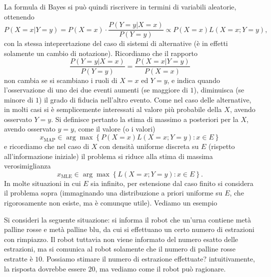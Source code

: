 \documentclass[
  italian,
  letterpaper,
]{book}
\newcommand{\cur}[1]{\left\{ #1 \right\}}
\newcommand{\map}{\operatorname{MAP}}
\newcommand{\mle}{\operatorname{MLE}}
\theoremstyle{definition}
\theoremstyle{remark}
\begin{document}
La formula di Bayes si può quindi riscrivere in termini di variabili
aleatorie, ottenendo
\[ P(X=x | Y =y ) = P(X=x) \cdot  \frac{ P(Y=y | X=x)}{P(Y=y)} \propto P(X=x)L(X=x; Y=y),\]
con la stessa inteprertazione del caso di sistemi di alternative (è in
effetti solamente un cambio di notazione). Ricordiamo che il rapporto
\[ \frac{ P(Y=y | X=x)}{P(Y=y)} = \frac{ P(X=x | Y=y)}{P(X=x)}\] non
cambia se si scambiano i ruoli di \(X=x\) ed \(Y=y\), e indica quando
l'osservazione di uno dei due eventi aumenti (se maggiore di \(1\)),
diminuisca (se minore di \(1\)) il grado di fiducia nell'altro evento.
Come nel caso delle alternative, in molti casi si è semplicemente
interessati al valore più probabile della \(X\), avendo osservato
\(Y=y\). Si definisce pertanto la stima di massimo a posteriori per la
\(X\), avendo osservato \(y=y\), come il valore (o i valori)
\[ x_{\map} \in \arg \max \cur{ P(X=x) L(X=x; Y=y) : x \in E}\] e
ricordiamo che nel caso di \(X\) con densità uniforme discreta su \(E\)
(rispetto all'informazione iniziale) il problema si riduce alla stima di
massima verosimiglianza
\[ x_{\mle} \in  \arg \max \cur{L(X=x; Y=y) : x \in E}.\] In molte
situazioni in cui \(E\) sia infinito, per estensione dal caso finito si
considera il problema sopra (immaginando una distribuzione a priori
uniforme su \(E\), che rigorosamente non esiste, ma è comunque utile).
Vediamo un esempio

Si consideri la seguente situazione: si informa il robot che un'urna
contiene metà palline rosse e metà palline blu, da cui si effettuano un
certo numero di estrazioni con rimpiazzo. Il robot tuttavia non viene
informato del numero esatto delle estrazioni, ma si comunica al robot
solamente che il numero di palline rosse estratte è \(10\). Possiamo
stimare il numero di estrazione effettuate? intuitivamente, la risposta
dovrebbe essere \(20\), ma vediamo come il robot può ragionare.
\end{document}
